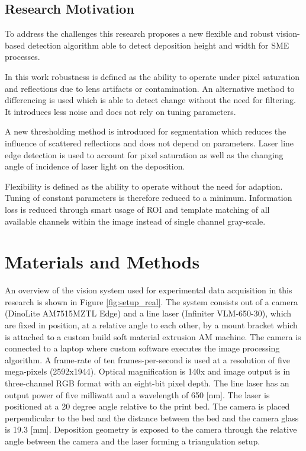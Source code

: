\documentclass[10pt,letter]{article}
\begin{document}
\subsection{Research Motivation}

To address the challenges this research proposes a new flexible and robust vision-based detection algorithm able to detect deposition height and width for SME processes. 

In this work robustness is defined as the ability to operate under pixel saturation and reflections due to lens artifacts or contamination. An alternative method to differencing is used which is able to detect change without the need for filtering. It introduces less noise and does not rely on tuning parameters. 

A new thresholding method is introduced for segmentation which reduces the influence of scattered reflections and does not depend on parameters. Laser line edge detection is used to account for pixel saturation as well as the changing angle of incidence of laser light on the deposition.

Flexibility is defined as the ability to operate without the need for adaption. Tuning of constant parameters is therefore reduced to a minimum. Information loss is reduced through smart usage of ROI and template matching of all available channels within the image instead of single channel gray-scale.   

\section{Materials and Methods}

An overview of the vision system used for experimental data acquisition in this research is shown in Figure \ref{fig:setup_real}. The system consists out of a camera (DinoLite AM7515MZTL Edge) and a line laser (Infiniter VLM-650-30), which are fixed in position, at a relative angle to each other, by a mount bracket which is attached to a custom build soft material extrusion AM machine. The camera is connected to a laptop where custom software executes the image processing algorithm. A frame-rate of ten frames-per-second is used at a resolution of five mega-pixels (2592x1944). Optical magnification is 140x and image output is in three-channel RGB format with an eight-bit pixel depth. The line laser has an output power of five milliwatt and a wavelength of 650 [nm].
The laser is positioned at a 20 degree angle relative to the print bed. The camera is placed perpendicular to the bed and the distance between the bed and the camera glass is 19.3 [mm]. Deposition geometry is exposed to the camera through the relative angle between the camera and the laser forming a triangulation setup.
\end{document}
